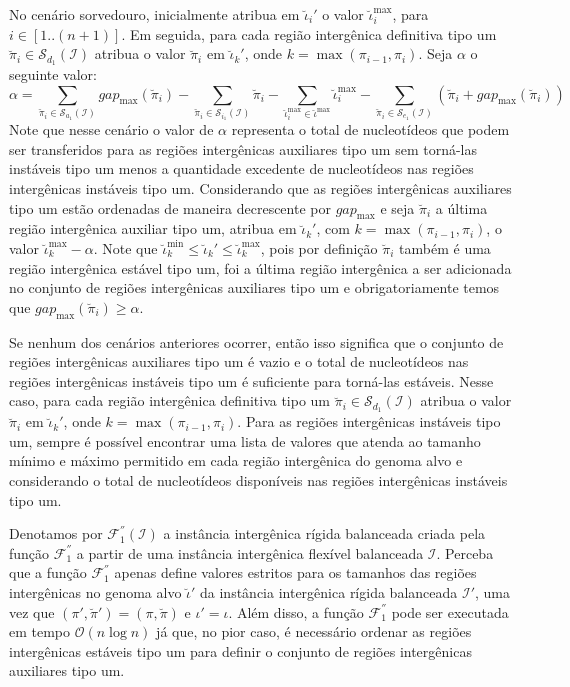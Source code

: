 \begin{itemize}
  No cenário sorvedouro, inicialmente atribua em $\breve\iota_{i}'$ o valor $\breve\iota^{\max}_i$, para $i \in [1..({n+1})]$. Em seguida, para cada região intergênica definitiva tipo um $\breve\pi_i \in \mathcal{S}_{d_{1}}(\mathcal{I})$ atribua o valor $\breve\pi_i$ em $\breve\iota_{k}'$, onde $k = \max(\pi_{i-1},\pi_i)$. Seja $\alpha$ o seguinte valor:
$$\alpha = \sum_{\breve\pi_i \in \mathcal{S}_{a_{1}}(\mathcal{I})} gap_{\max}(\breve\pi_i) - \sum_{\breve\pi_i \in \mathcal{S}_{i_{1}}(\mathcal{I})} \breve\pi_i - \sum_{\breve\iota_{i}^{\max}  \in \breve\iota^{\max}} \breve\iota_{i}^{\max} - \sum_{\breve\pi_i \in \mathcal{S}_{e_{1}}(\mathcal{I})} (\breve\pi_i + gap_{\max}(\breve\pi_i))$$
  Note que nesse cenário o valor de $\alpha$ representa o total de nucleotídeos que podem ser transferidos para as regiões intergênicas auxiliares tipo um sem torná-las instáveis tipo um menos a quantidade excedente de nucleotídeos nas regiões intergênicas instáveis tipo um. Considerando que as regiões intergênicas auxiliares tipo um estão ordenadas de maneira decrescente por $gap_{\max}$ e seja $\breve\pi_i$ a última região intergênica auxiliar tipo um, atribua em $\breve\iota_{k}'$, com $k = \max(\pi_{i-1},\pi_i)$, o valor $\breve\iota^{\max}_k - \alpha$. Note que $\breve\iota^{\min}_k \le \breve\iota_{k}' \le \breve\iota^{\max}_k$, pois por definição $\breve\pi_i$ também é uma região intergênica estável tipo um, foi a última região intergênica a ser adicionada no conjunto de regiões intergênicas auxiliares tipo um e obrigatoriamente temos que $gap_{\max}(\breve\pi_i) \ge \alpha$.

  Se nenhum dos cenários anteriores ocorrer, então isso significa que o conjunto de regiões intergênicas auxiliares tipo um é vazio e o total de nucleotídeos nas regiões intergênicas instáveis tipo um é suficiente para torná-las estáveis. Nesse caso, para cada região intergênica definitiva tipo um $\breve\pi_i \in \mathcal{S}_{d_{1}}(\mathcal{I})$ atribua o valor $\breve\pi_i$ em $\breve\iota_{k}'$, onde $k = \max(\pi_{i-1},\pi_i)$. Para as regiões intergênicas instáveis tipo um, sempre é possível encontrar uma lista de valores que atenda ao tamanho mínimo e máximo permitido em cada região intergênica do genoma alvo e considerando o total de nucleotídeos disponíveis nas regiões intergênicas instáveis tipo um.
\end{itemize}

Denotamos por $\mathcal{F}_{1}^{''}(\mathcal{I})$ a instância intergênica rígida balanceada criada pela função $\mathcal{F}_{1}^{''}$ a partir de uma instância intergênica flexível balanceada $\mathcal{I}$. Perceba que a função $\mathcal{F}_{1}^{''}$ apenas define valores estritos para os tamanhos das regiões intergênicas no genoma alvo $\breve\iota'$ da instância intergênica rígida balanceada $\mathcal{I'}$, uma vez que $(\pi',\breve\pi') = (\pi,\breve\pi)$ e $\iota' = \iota$. Além disso, a função $\mathcal{F}_{1}^{''}$ pode ser executada em tempo $\mathcal{O}(n\log n)$ já que, no pior caso, é necessário ordenar as regiões intergênicas estáveis tipo um para definir o conjunto de regiões intergênicas auxiliares tipo um.

